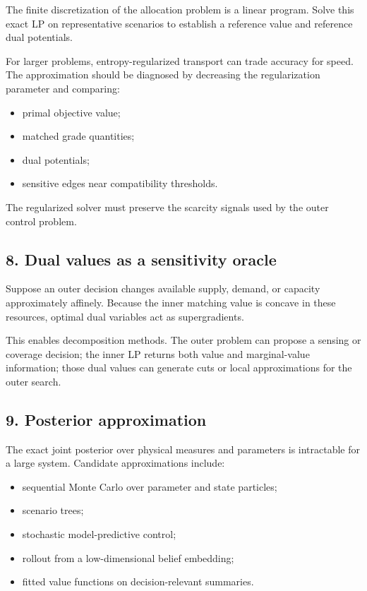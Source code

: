 The finite discretization of the allocation problem is a linear program. Solve
this exact LP on representative scenarios to establish a reference value and
reference dual potentials.

For larger problems, entropy-regularized transport can trade accuracy for speed.
The approximation should be diagnosed by decreasing the regularization parameter
and comparing:

\begin{itemize}
\tightlist
\item
  primal objective value;
\item
  matched grade quantities;
\item
  dual potentials;
\item
  sensitive edges near compatibility thresholds.
\end{itemize}

The regularized solver must preserve the scarcity signals used by the outer
control problem.

\subsection{8. Dual values as a sensitivity oracle}\label{dual-values-as-a-sensitivity-oracle}

Suppose an outer decision changes available supply, demand, or capacity
approximately affinely. Because the inner matching value is concave in these
resources, optimal dual variables act as supergradients.

This enables decomposition methods. The outer problem can propose a sensing or
coverage decision; the inner LP returns both value and marginal-value
information; those dual values can generate cuts or local approximations for the
outer search.

\subsection{9. Posterior approximation}\label{posterior-approximation}

The exact joint posterior over physical measures and parameters is intractable
for a large system. Candidate approximations include:

\begin{itemize}
\tightlist
\item
  sequential Monte Carlo over parameter and state particles;
\item
  scenario trees;
\item
  stochastic model-predictive control;
\item
  rollout from a low-dimensional belief embedding;
\item
  fitted value functions on decision-relevant summaries.
\end{itemize}

